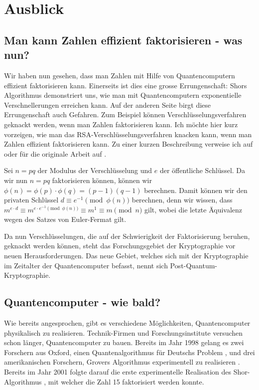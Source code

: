 \chapter{Ausblick}
\section{Man kann Zahlen effizient faktorisieren - was nun?}
Wir haben nun gesehen, dass man Zahlen mit Hilfe von Quantencomputern effizient faktorisieren kann. Einerseits ist dies eine grosse Errungenschaft: Shors Algorithmus demonstriert uns, wie man mit Quantencomputern exponentielle Verschnellerungen erreichen kann. Auf der anderen Seite birgt diese Errungenschaft auch Gefahren. Zum Beispiel können Verschlüsselungsverfahren geknackt werden, wenn man Zahlen faktorisieren kann. Ich möchte hier kurz vorzeigen, wie man das RSA-Verschlüsselungsverfahren knacken kann, wenn man Zahlen effizient faktorisieren kann. Zu einer kurzen Beschreibung verweise ich auf \cite{rsaintro} oder für die originale Arbeit auf \cite{rsaorig}. 

Sei $n = pq$ der Modulus der Verschlüsselung und $e$ der öffentliche Schlüssel. Da wir nun $n = pq$ faktorisieren können, können wir $\phi(n) = \phi(p)\cdot\phi(q) = (p - 1)(q - 1)$ berechnen. Damit können wir den privaten Schlüssel $d \equiv e^{-1} \pmod{\phi(n)}$ berechnen, denn wir wissen, dass $m^{e\cdot d} \equiv m^{e\cdot e^{-1} \pmod{\phi(n)}} \equiv m^1 \equiv m \pmod{n}$ gilt, wobei die letzte Äquivalenz wegen des Satzes von Euler-Fermat gilt.

Da nun Verschlüsselungen, die auf der Schwierigkeit der Faktorisierung beruhen, geknackt werden können, steht das Forschungsgebiet der Kryptographie vor neuen Herausforderungen. Das neue Gebiet, welches sich mit der Kryptographie im Zeitalter der Quantencomputer befasst, nennt sich Post-Quantum-Kryptographie.

\section{Quantencomputer - wie bald?}
Wie bereits angesprochen, gibt es verschiedene Möglichkeiten, Quantencomputer physikalisch zu realisieren. Technik-Firmen und Forschungsinstitute versuchen schon länger, Quantencomputer zu bauen. Bereits im Jahr 1998 gelang es zwei Forschern aus Oxford, einen Quantenalgorithmus für Deutschs Problem \cite{qimpdj}, und drei amerikanischen Forschern, Grovers Algorithmus experimentell zu realisieren \cite{qimpgr}. Bereits im Jahr 2001 folgte darauf die erste experimentelle Realisation des Shor-Algorithmus \cite{ShorImp}, mit welcher die Zahl 15 faktorisiert werden konnte.

